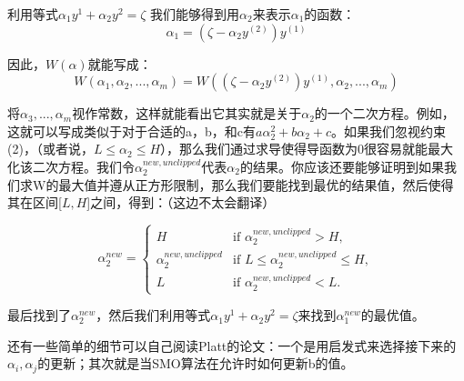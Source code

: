 \documentclass[UTF8]{ctexart}
\begin{document}
利用等式$\alpha_{1}y^{1} + \alpha_{2}y^{2}=\zeta$ 我们能够得到用$\alpha_{2}$来表示$\alpha_{1}$的函数：
\[ \alpha_{1}= (\zeta-\alpha_{2}y^{(2)})y^{(1)}\]

因此，$W(\alpha)$就能写成：\[ W(\alpha_{1},\alpha_{2},...,\alpha_{m}) = W( (\zeta-\alpha_{2}y^{(2)})y^{(1)},\alpha_{2},...,\alpha_{m}) \]

将$\alpha_{3},...,\alpha_{m}$视作常数，这样就能看出它其实就是关于$\alpha_{2}$的一个二次方程。例如，这就可以写成类似于对于合适的a，b，和c有$a\alpha_{2}^{2}+b\alpha_{2}+c$。如果我们忽视约束(2)，（或者说，$L \leq \alpha_{2} \leq H$），那么我们通过求导使得导函数为0很容易就能最大化该二次方程。我们令$\alpha_{2}^{new,unclipped}$代表$\alpha_{2}$的结果。你应该还要能够证明到如果我们求W的最大值并遵从正方形限制，那么我们要能找到最优的结果值，然后使得其在区间[$L,H$]之间，得到：（这边不太会翻译）

\begin{equation*}
  \alpha_{2}^{new} = \left\{
    \begin{array}{rl}
      H & \text{if } \alpha_{2}^{new,unclipped} > H,\\
      \alpha_{2}^{new,unclipped} & \text{if } L \leq \alpha_{2}^{new,unclipped} \leq H,\\
      L & \text{if } \alpha_{2}^{new,unclipped} < L.
    \end{array} \right.
\end{equation*}


最后找到了$\alpha_{2}^{new}$，然后我们利用等式$\alpha_{1}y^{1} + \alpha_{2}y^{2}=\zeta$来找到$\alpha_{1}^{new}$的最优值。

还有一些简单的细节可以自己阅读Platt的论文：一个是用启发式来选择接下来的$\alpha_{i},\alpha_{j}$的更新；其次就是当SMO算法在允许时如何更新b的值。
\end{document}
